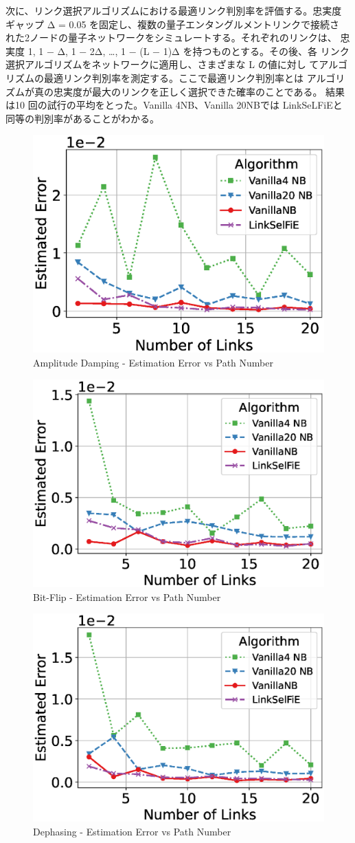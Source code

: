 \documentclass[conference]{IEEEtran}
\begin{document}
次に、リンク選択アルゴリズムにおける最適リンク判別率を評価する。忠実度
ギャップ Δ = 0.05 を固定し、複数の量子エンタングルメントリンクで接続さ
れた2ノードの量子ネットワークをシミュレートする。それぞれのリンクは、
忠実度 1, 1 − Δ, 1 − 2Δ, …, 1 − (L − 1)Δ を持つものとする。その後、各
リンク選択アルゴリズムをネットワークに適用し、さまざまな L の値に対し
てアルゴリズムの最適リンク判別率を測定する。ここで最適リンク判別率とは
アルゴリズムが真の忠実度が最大のリンクを正しく選択できた確率のことである。
結果は10 回の試行の平均をとった。Vanilla 4NB、Vanilla 20NBでは
LinkSeLFiEと同等の判別率があることがわかる。

\begin{figure}[t]
\centering
\includegraphics[width=0.45\columnwidth]{figure/plot_error_vs_path_num_AmplitudeDamping.eps}
\caption{Amplitude Damping - Estimation Error vs Path Number}
\label{fig:error_amplitude}
\end{figure}

\begin{figure}[t]
\centering
\includegraphics[width=0.45\columnwidth]{figure/plot_error_vs_path_num_BitFlip.eps}
\caption{Bit-Flip - Estimation Error vs Path Number}
\label{fig:error_bitflip}
\end{figure}

\begin{figure}[t]
\centering
\includegraphics[width=0.45\columnwidth]{figure/plot_error_vs_path_num_Dephase.eps}
\caption{Dephasing - Estimation Error vs Path Number}
\label{fig:error_dephase}
\end{figure}
\end{document}
